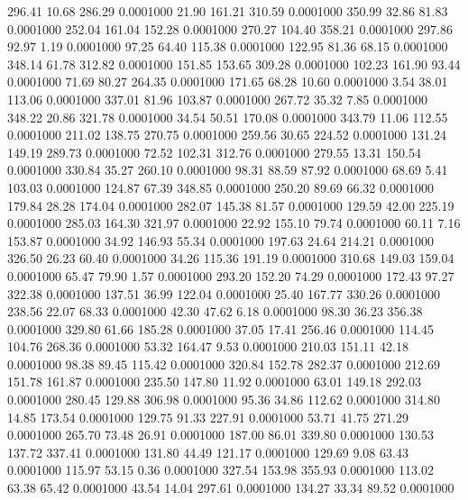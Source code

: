  296.41   10.68  286.29   0.0001000
  21.90  161.21  310.59   0.0001000
 350.99   32.86   81.83   0.0001000
 252.04  161.04  152.28   0.0001000
 270.27  104.40  358.21   0.0001000
 297.86   92.97    1.19   0.0001000
  97.25   64.40  115.38   0.0001000
 122.95   81.36   68.15   0.0001000
 348.14   61.78  312.82   0.0001000
 151.85  153.65  309.28   0.0001000
 102.23  161.90   93.44   0.0001000
  71.69   80.27  264.35   0.0001000
 171.65   68.28   10.60   0.0001000
   3.54   38.01  113.06   0.0001000
 337.01   81.96  103.87   0.0001000
 267.72   35.32    7.85   0.0001000
 348.22   20.86  321.78   0.0001000
  34.54   50.51  170.08   0.0001000
 343.79   11.06  112.55   0.0001000
 211.02  138.75  270.75   0.0001000
 259.56   30.65  224.52   0.0001000
 131.24  149.19  289.73   0.0001000
  72.52  102.31  312.76   0.0001000
 279.55   13.31  150.54   0.0001000
 330.84   35.27  260.10   0.0001000
  98.31   88.59   87.92   0.0001000
  68.69    5.41  103.03   0.0001000
 124.87   67.39  348.85   0.0001000
 250.20   89.69   66.32   0.0001000
 179.84   28.28  174.04   0.0001000
 282.07  145.38   81.57   0.0001000
 129.59   42.00  225.19   0.0001000
 285.03  164.30  321.97   0.0001000
  22.92  155.10   79.74   0.0001000
  60.11    7.16  153.87   0.0001000
  34.92  146.93   55.34   0.0001000
 197.63   24.64  214.21   0.0001000
 326.50   26.23   60.40   0.0001000
  34.26  115.36  191.19   0.0001000
 310.68  149.03  159.04   0.0001000
  65.47   79.90    1.57   0.0001000
 293.20  152.20   74.29   0.0001000
 172.43   97.27  322.38   0.0001000
 137.51   36.99  122.04   0.0001000
  25.40  167.77  330.26   0.0001000
 238.56   22.07   68.33   0.0001000
  42.30   47.62    6.18   0.0001000
  98.30   36.23  356.38   0.0001000
 329.80   61.66  185.28   0.0001000
  37.05   17.41  256.46   0.0001000
 114.45  104.76  268.36   0.0001000
  53.32  164.47    9.53   0.0001000
 210.03  151.11   42.18   0.0001000
  98.38   89.45  115.42   0.0001000
 320.84  152.78  282.37   0.0001000
 212.69  151.78  161.87   0.0001000
 235.50  147.80   11.92   0.0001000
  63.01  149.18  292.03   0.0001000
 280.45  129.88  306.98   0.0001000
  95.36   34.86  112.62   0.0001000
 314.80   14.85  173.54   0.0001000
 129.75   91.33  227.91   0.0001000
  53.71   41.75  271.29   0.0001000
 265.70   73.48   26.91   0.0001000
 187.00   86.01  339.80   0.0001000
 130.53  137.72  337.41   0.0001000
 131.80   44.49  121.17   0.0001000
 129.69    9.08   63.43   0.0001000
 115.97   53.15    0.36   0.0001000
 327.54  153.98  355.93   0.0001000
 113.02   63.38   65.42   0.0001000
  43.54   14.04  297.61   0.0001000
 134.27   33.34   89.52   0.0001000

